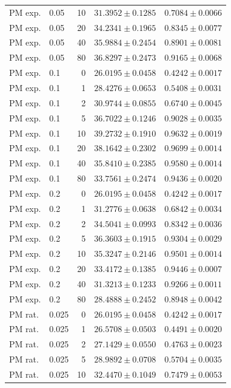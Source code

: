 \begin{longtable}{llrll}
PM exp. & 0.05 & 10 & $31.3952 \pm 0.1285$ & $0.7084 \pm 0.0066$ \\
PM exp. & 0.05 & 20 & $34.2341 \pm 0.1965$ & $0.8345 \pm 0.0077$ \\
PM exp. & 0.05 & 40 & $35.9884 \pm 0.2454$ & $0.8901 \pm 0.0081$ \\
PM exp. & 0.05 & 80 & $36.8297 \pm 0.2473$ & $0.9165 \pm 0.0068$ \\
PM exp. & 0.1 & 0 & $26.0195 \pm 0.0458$ & $0.4242 \pm 0.0017$ \\
PM exp. & 0.1 & 1 & $28.4276 \pm 0.0653$ & $0.5408 \pm 0.0031$ \\
PM exp. & 0.1 & 2 & $30.9744 \pm 0.0855$ & $0.6740 \pm 0.0045$ \\
PM exp. & 0.1 & 5 & $36.7022 \pm 0.1246$ & $0.9028 \pm 0.0035$ \\
PM exp. & 0.1 & 10 & $39.2732 \pm 0.1910$ & $0.9632 \pm 0.0019$ \\
PM exp. & 0.1 & 20 & $38.1642 \pm 0.2302$ & $0.9699 \pm 0.0014$ \\
PM exp. & 0.1 & 40 & $35.8410 \pm 0.2385$ & $0.9580 \pm 0.0014$ \\
PM exp. & 0.1 & 80 & $33.7561 \pm 0.2474$ & $0.9436 \pm 0.0020$ \\
PM exp. & 0.2 & 0 & $26.0195 \pm 0.0458$ & $0.4242 \pm 0.0017$ \\
PM exp. & 0.2 & 1 & $31.2776 \pm 0.0638$ & $0.6842 \pm 0.0034$ \\
PM exp. & 0.2 & 2 & $34.5041 \pm 0.0993$ & $0.8342 \pm 0.0036$ \\
PM exp. & 0.2 & 5 & $36.3603 \pm 0.1915$ & $0.9304 \pm 0.0029$ \\
PM exp. & 0.2 & 10 & $35.3247 \pm 0.2146$ & $0.9501 \pm 0.0014$ \\
PM exp. & 0.2 & 20 & $33.4172 \pm 0.1385$ & $0.9446 \pm 0.0007$ \\
PM exp. & 0.2 & 40 & $31.3213 \pm 0.1233$ & $0.9266 \pm 0.0011$ \\
PM exp. & 0.2 & 80 & $28.4888 \pm 0.2452$ & $0.8948 \pm 0.0042$ \\
PM rat. & 0.025 & 0 & $26.0195 \pm 0.0458$ & $0.4242 \pm 0.0017$ \\
PM rat. & 0.025 & 1 & $26.5708 \pm 0.0503$ & $0.4491 \pm 0.0020$ \\
PM rat. & 0.025 & 2 & $27.1429 \pm 0.0550$ & $0.4763 \pm 0.0023$ \\
PM rat. & 0.025 & 5 & $28.9892 \pm 0.0708$ & $0.5704 \pm 0.0035$ \\
PM rat. & 0.025 & 10 & $32.4470 \pm 0.1049$ & $0.7479 \pm 0.0053$ \\

\end{longtable}

